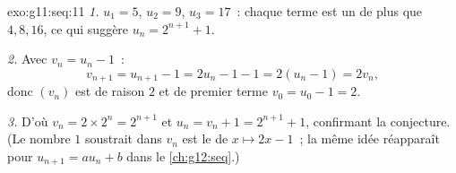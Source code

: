 \begin{solution}{exo:g11:seq:11}
\emph{1.} $u_1 = 5$, $u_2 = 9$, $u_3 = 17$~: chaque terme est un de plus
que $4, 8, 16$, ce qui suggère $u_n = 2^{n+1} + 1$.

\emph{2.} Avec $v_n = u_n - 1$~:
\[
v_{n+1} = u_{n+1} - 1 = 2u_n - 1 - 1 = 2(u_n - 1) = 2v_n,
\]
donc $(v_n)$ est  de raison $2$ et de premier terme
$v_0 = u_0 - 1 = 2$.

\emph{3.} D'où $v_n = 2 \times 2^n = 2^{n+1}$ et
$u_n = v_n + 1 = 2^{n+1} + 1$, confirmant la conjecture. (Le nombre $1$
soustrait dans $v_n$ est le  de $x \mapsto 2x - 1$~; la même
idée réapparaît pour $u_{n+1} = au_n + b$ dans le \cref{ch:g12:seq}.)
\end{solution}

